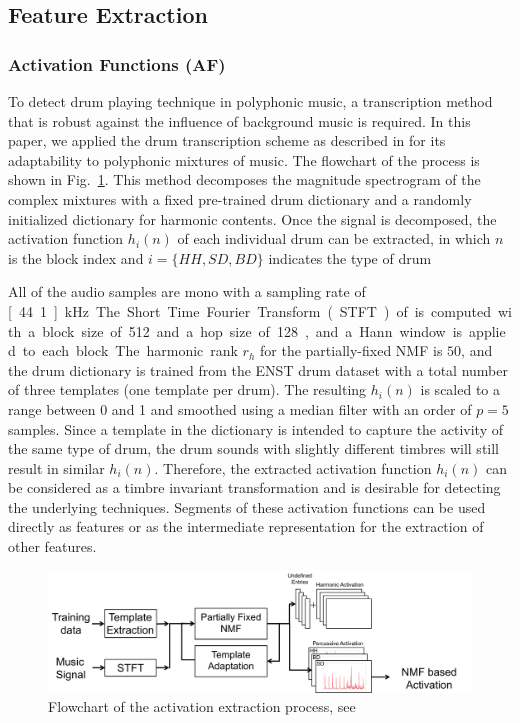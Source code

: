 \documentclass{article}
\begin{document}
\subsection{Feature Extraction}\label{ssec:featuresExtract}
\subsubsection{Activation Functions (AF)}
\label{sssec:activ}

To detect drum playing technique in polyphonic music, a transcription method that is robust against the influence of background music is required. In this paper, we applied the drum transcription scheme as described in \cite{Wu2015a} for its adaptability to polyphonic mixtures of music. The flowchart of the process is shown in Fig.~\ref{fig:nmf}. This method decomposes the magnitude spectrogram of the complex mixtures with a fixed pre-trained drum dictionary and a randomly initialized dictionary for harmonic contents. Once the signal is decomposed, the activation function $h_{i}(n)$ of each individual drum can be extracted, in which $n$ is the block index and $i = \{HH, SD, BD\}$ indicates the type of drum

All of the audio samples are mono with a sampling rate of \unit[44.1]{kHz}. The Short Time Fourier Transform (STFT) of is computed with a block size of 512 and a hop size of 128, and a Hann window is applied to each block. The harmonic rank $r_{h} $ for the partially-fixed NMF is  $50$, {\color{red}and the drum dictionary is trained from the ENST drum dataset \cite{Gillet2006} with a total number of three templates (one template per drum).} The resulting $h_{i}(n)$ is scaled to a range between 0 and 1 and smoothed using a median filter with an order of $p = 5$ samples. Since a template in the dictionary is intended to capture the activity of the same type of drum, the drum sounds with slightly different timbres will still result in similar $h_{i}(n)$. Therefore, the extracted activation function $h_{i}(n)$ can be considered as a timbre invariant transformation and is desirable for detecting the underlying techniques. Segments of these activation functions can be used directly as features or as the intermediate representation for the extraction of other features. 

\begin{figure}
\centering
\includegraphics[width = 8.5 cm]{./figures/nmf.png}
\caption{Flowchart of the activation extraction process, see \cite{Wu2015a}}
\label{fig:nmf}
\end{figure}
\end{document}
